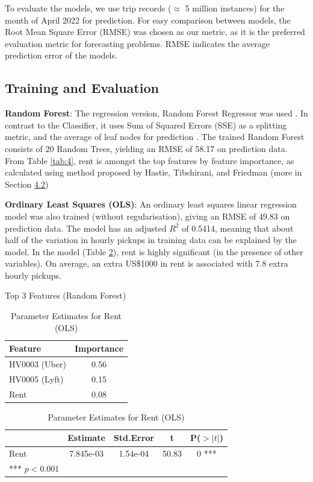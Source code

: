 \documentclass[11pt]{article}
\begin{document}
To evaluate the models, we use trip records ($\approx$ 5 million instances) for the month of April 2022 for prediction. For easy comparison between models, the Root Mean Square Error (RMSE) was chosen as our metric, as it is the preferred evaluation metric for forecasting problems. RMSE indicates the average prediction error of the models.

\subsection{Training and Evaluation}
\textbf{Random Forest}: The regression version, Random Forest Regressor was used \cite{rf}. In contrast to the Classifier, it uses Sum of Squared Errors (SSE) as a splitting metric, and the average of leaf nodes for prediction \cite[263]{dtbook}. The trained Random Forest consists of 20 Random Trees, yielding an RMSE of 58.17 on prediction data. From Table \ref{tab:4}, rent is amongst the top features by feature importance, as calculated using method proposed by Hastie, Tibshirani, and Friedman \cite[368]{ftimp} (more in Section \hyperlink{subsection.4.2}{4.2})

\textbf{Ordinary Least Squares (OLS)}: An ordinary least squares linear regression model was also trained (without regularisation), giving an RMSE of 49.83 on prediction data. The model has an adjusted $R^2$ of 0.5414, meaning that about half of the variation in hourly pickups in training data can be explained by the model. In the model (Table \ref{tab:5}), rent is highly significant (in the presence of other variables). On average, an extra US\$1000 in rent is associated with 7.8 extra hourly pickups. 
\begin{table}[!htb]
    \begin{minipage}[]{.45\linewidth}
    \vspace{16pt}
    \centering
    \caption{Top 3 Features (Random Forest)}
    \label{tab:4}
    \begin{tabular}{ l c } 
      \hline
         Feature & Importance \\
           \hline
        HV0003 (Uber) & 0.56 \\
        HV0005 (Lyft) & 0.15 \\
        Rent & 0.08 \\
        \hline
    \end{tabular}
    \end{minipage}
    \begin{minipage}[]{.45\linewidth}
    \vspace{0pt}

    \caption{Parameter Estimates for Rent (OLS)}
    \label{tab:5}
    \begin{tabular}{ l c c c c } 
      \hline
      & Estimate  & Std.Error  & t  &P($>|t|$) \\
        \hline
        Rent& 7.845e-03 & 1.54e-04 & 50.83 & 0 *** \\
    \hline
    *** $p<0.001$ 
    \end{tabular}
    \end{minipage}
    
\end{table}
\end{document}
